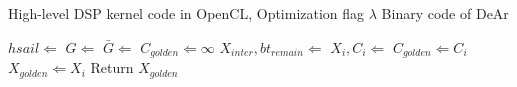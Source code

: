             \begin{algorithm}[h]
              \caption{}
              \begin{algorithmic}[1]
                    \Require 
                        High-level DSP kernel code in OpenCL, Optimization flag $\lambda$
                    \Ensure 
                        Binary code of DeAr

                  \State $hsail \Leftarrow$ 
                  \label{line:tohsail}
                  \State $G \Leftarrow$ 
                  \label{line:trans}
                  \State $\bar{G} \Leftarrow$ 
                  \label{line:trane}
                  \State $C_{golden} \Leftarrow  \infty$
                  \label{line:optstart}
                    \label{line:forlambda}
                    \State $X_{inter}, bt_{remain} \Leftarrow$ 
                    \State $X_i, C_i \Leftarrow$ 
                      \State $C_{golden} \Leftarrow C_i$
                      \State $X_{golden} \Leftarrow X_i$
                    \EndIf
                  \EndFor
                  \State Return $X_{golden}$
                  \label{line:optend}
              \end{algorithmic}
              \label{alg:framework}
            \end{algorithm}

